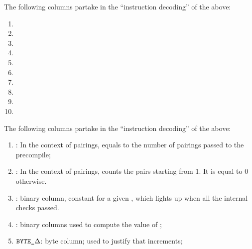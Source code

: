 The following columns partake in the ``instruction decoding'' of the above:
\begin{multicols}{2}
      \begin{enumerate}[resume]
            \item \isEcrecoverData
            \item \isEcrecoverResult
            \item \isEcaddData
            \item \isEcaddResult
            \item \isEcmulData
            \item \isEcmulResult
            \item \isEcpairingData
            \item \isEcpairingResult
            \item \isPVerifyData
                  \setcounter{enumTemp}{\theenumi}\item \isPVerifyResult
      \end{enumerate}
\end{multicols}
The following columns partake in the ``instruction decoding'' of the above:
\begin{enumerate}[resume] \setcounter{enumi}{1+\theenumTemp}
      \item \totalPairings:
            In the context of pairings, equals to the number of pairings passed to the precompile;
      \item \accPairings: In the context of pairings, counts the pairs starting from 1. It is equal to 0 otherwise.
      \item \both{\internalChecksPassed}:
            binary column, constant for a given \ecdataId, which lights up when all the internal checks passed.
      \item \hurdle:
            binary columns used to compute the value of \internalChecksPassed;
      \item $\texttt{BYTE}\texttt{\_$\Delta$}$:
            byte column; used to justify that \ecdataId{} increments;
\end{enumerate}


